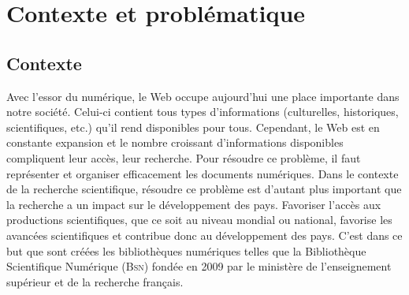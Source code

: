   \chapter{Contexte et problématique}
    \section{Contexte}
      Avec l'essor du numérique, le Web occupe aujourd'hui une place importante
      dans notre société. Celui-ci contient tous types d'informations
      (culturelles, historiques, scientifiques, etc.) qu'il rend disponibles
      pour tous. Cependant, le Web est en constante expansion et le nombre
      croissant d'informations disponibles compliquent leur accès, leur
      recherche. Pour résoudre ce problème, il faut représenter et organiser
      efficacement les documents numériques. Dans le contexte de la recherche
      scientifique, résoudre ce problème est d'autant plus important que la
      recherche a un impact sur le développement des pays. Favoriser l'accès aux
      productions scientifiques, que ce soit au niveau mondial ou national,
      favorise les avancées scientifiques et contribue donc au développement des
      pays. C'est dans ce but que sont créées les bibliothèques numériques
      telles que la Bibliothèque Scientifique Numérique (\textsc{Bsn}) fondée en
      2009 par le ministère de l'enseignement supérieur et de la recherche
      français.

